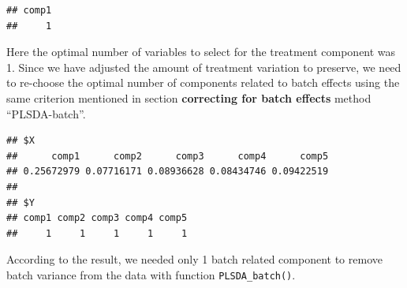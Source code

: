 \documentclass[
]{book}
\newenvironment{Shaded}{\begin{snugshade}}{\end{snugshade}}
\newcommand{\AttributeTok}[1]{\textcolor[rgb]{0.77,0.63,0.00}{#1}}
\newcommand{\CommentTok}[1]{\textcolor[rgb]{0.56,0.35,0.01}{\textit{#1}}}
\newcommand{\DecValTok}[1]{\textcolor[rgb]{0.00,0.00,0.81}{#1}}
\newcommand{\FunctionTok}[1]{\textcolor[rgb]{0.00,0.00,0.00}{#1}}
\newcommand{\NormalTok}[1]{#1}
\newcommand{\OtherTok}[1]{\textcolor[rgb]{0.56,0.35,0.01}{#1}}
\newcommand{\SpecialCharTok}[1]{\textcolor[rgb]{0.00,0.00,0.00}{#1}}
\begin{document}
\begin{verbatim}
## comp1 
##     1
\end{verbatim}

Here the optimal number of variables to select for the treatment component was 1. Since we have adjusted the amount of treatment variation to preserve, we need to re-choose the optimal number of components related to batch effects using the same criterion mentioned in section \textbf{correcting for batch effects} method ``PLSDA-batch''.

\begin{Shaded}
\end{Shaded}

\begin{verbatim}
## $X
##      comp1      comp2      comp3      comp4      comp5 
## 0.25672979 0.07716171 0.08936628 0.08434746 0.09422519 
## 
## $Y
## comp1 comp2 comp3 comp4 comp5 
##     1     1     1     1     1
\end{verbatim}

According to the result, we needed only 1 batch related component to remove batch variance from the data with function \texttt{PLSDA\_batch()}.

\begin{Shaded}
\end{Shaded}
\end{document}
